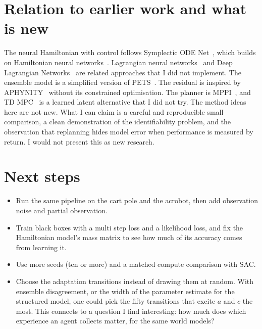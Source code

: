 \documentclass[11pt,a4paper]{article}
\begin{document}
\section{Relation to earlier work and what is new}
\label{sec:related}
The neural Hamiltonian with control follows Symplectic ODE Net~\cite{zhong2020symoden}, which builds on Hamiltonian neural networks~\cite{greydanus2019hnn}. Lagrangian neural networks~\cite{cranmer2020lnn} and Deep Lagrangian Networks~\cite{lutter2019delan} are related approaches that I did not implement. The ensemble model is a simplified version of PETS~\cite{chua2018pets}. The residual is inspired by APHYNITY~\cite{yin2021aphynity} without its constrained optimisation. The planner is MPPI~\cite{williams2017mppi,williams2016aggressive}, and TD MPC~\cite{hansen2022tdmpc} is a learned latent alternative that I did not try. The method ideas here are not new. What I can claim is a careful and reproducible small comparison, a clean demonstration of the identifiability problem, and the observation that replanning hides model error when performance is measured by return. I would not present this as new research.

\section{Next steps}
\begin{itemize}[leftmargin=1.5em]
\item Run the same pipeline on the cart pole and the acrobot, then add observation noise and partial observation.
\item Train black boxes with a multi step loss and a likelihood loss, and fix the Hamiltonian model's mass matrix to see how much of its accuracy comes from learning it.
\item Use more seeds (ten or more) and a matched compute comparison with SAC.
\item Choose the adaptation transitions instead of drawing them at random. With ensemble disagreement, or the width of the parameter estimate for the structured model, one could pick the fifty transitions that excite $a$ and $c$ the most. This connects to a question I find interesting: how much does which experience an agent collects matter, for the same world models?
\end{itemize}

\appendix
\end{document}
